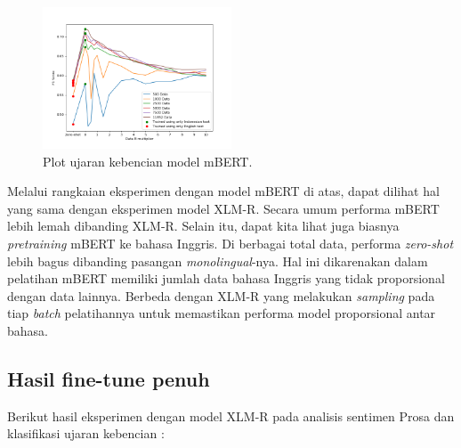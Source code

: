         \begin{figure}[ht]
            \centering
            \includegraphics[width=0.5\textwidth]{resources/plot-head-toxic-mbert.png}
            \caption{Plot ujaran kebencian model mBERT.}\label{fig:plot_head_toxic_mbert}
        \end{figure}

        Melalui rangkaian eksperimen dengan model mBERT di atas, dapat dilihat hal yang sama dengan eksperimen model XLM-R. Secara umum performa mBERT lebih lemah dibanding XLM-R. Selain itu, dapat kita lihat juga biasnya \textit{pretraining} mBERT ke bahasa Inggris. Di berbagai total data, performa \textit{zero-shot} lebih bagus dibanding pasangan \textit{monolingual}-nya. Hal ini dikarenakan dalam pelatihan mBERT memiliki jumlah data bahasa Inggris yang tidak proporsional dengan data lainnya. Berbeda dengan XLM-R yang melakukan \textit{sampling} pada tiap \textit{batch} pelatihannya untuk memastikan performa model proporsional antar bahasa.
            

    \subsection{Hasil fine-tune penuh}
        Berikut hasil eksperimen dengan model XLM-R pada analisis sentimen Prosa dan klasifikasi ujaran kebencian :

